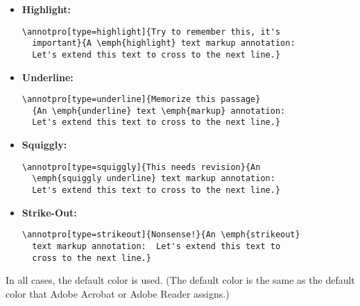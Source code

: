 \documentclass[12pt]{article}
\let\app\textsf
\let\amtIndent\leftmargini
\edef\amtIndent{\the\parindent}
\begin{document}
\begin{itemize}\tightsettings
\item \textbf{Highlight:} 
\begin{Verbatim}[xleftmargin=\amtIndent,fontsize=\small]
\annotpro[type=highlight]{Try to remember this, it's
  important}{A \emph{highlight} text markup annotation:
  Let's extend this text to cross to the next line.}
\end{Verbatim}

\item \textbf{Underline:} 
\begin{Verbatim}[xleftmargin=\amtIndent,fontsize=\small]
\annotpro[type=underline]{Memorize this passage}
  {An \emph{underline} text \emph{markup} annotation:
  Let's extend this text to cross to the next line.}
\end{Verbatim}

\item \textbf{Squiggly:} 
\begin{Verbatim}[xleftmargin=\amtIndent,fontsize=\small]
\annotpro[type=squiggly]{This needs revision}{An
  \emph{squiggly underline} text markup annotation:
  Let's extend this text to cross to the next line.}
\end{Verbatim}

\item \textbf{Strike-Out:}
\begin{Verbatim}[xleftmargin=\amtIndent,fontsize=\small]
\annotpro[type=strikeout]{Nonsense!}{An \emph{strikeout}
  text markup annotation:  Let's extend this text to
  cross to the next line.}
\end{Verbatim}
\end{itemize}
In all cases, the default color is used. (The default color is the same as
the default color that \app{Adobe Acrobat} or \app{Adobe Reader} assigns.)
\end{document}
